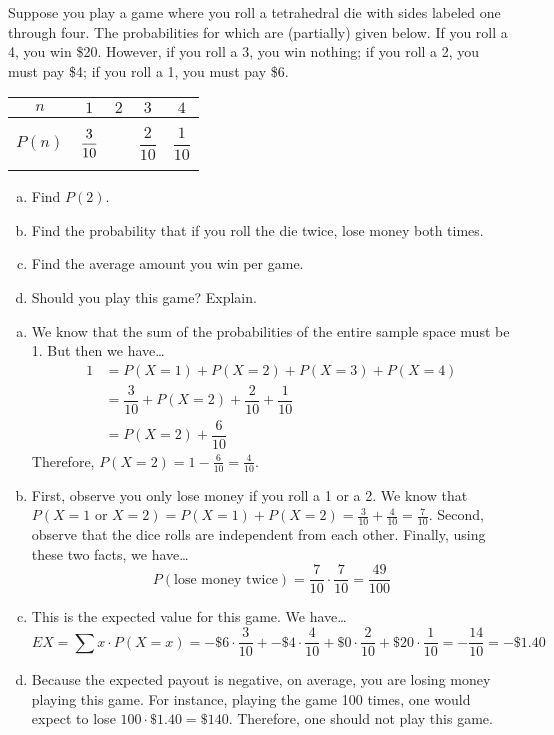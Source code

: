 \documentclass[11pt,letterpaper]{article}
\begin{document}
 Suppose you play a game where you roll a tetrahedral die with sides labeled one through four. The probabilities for which are (partially) given below. If you roll a 4, you win \$20. However, if you roll a 3, you win nothing; if you roll a 2, you must pay \$4; if you roll a 1, you must pay \$6. 
	\begin{table}[!ht]
	\centering 
	\begin{tabular}{|c||c|c|c|c|} \hline 
	$n$ & $1$ & $2$ & $3$ & $4$ \\ \hline 
	$P(n)$ & $\dfrac{3\rule{0pt}{2.9ex}}{10\rule[-1.3ex]{0pt}{0pt}}$ & \phantom{$\dfrac{00}{00}$} & $\dfrac{2}{10}$ & $\dfrac{1}{10}$ \\ \hline 
	\end{tabular}
	\end{table}

\begin{enumerate}[(a)]
\item Find $P(2)$. 
\item Find the probability that if you roll the die twice, lose money both times. 
\item Find the average amount you win per game. 
\item Should you play this game? Explain.
\end{enumerate} \pspace

\sol 
\begin{enumerate}[(a)]
\item We know that the sum of the probabilities of the entire sample space must be 1. But then we have\dots
	\[
	\begin{aligned}
	1&= P(X= 1) + P(X= 2) + P(X= 3) + P(X= 4) \\[0.3cm]
	&= \dfrac{3}{10} + P(X= 2) + \dfrac{2}{10} + \dfrac{1}{10} \\[0.3cm]
	&= P(X= 2) + \dfrac{6}{10}
	\end{aligned}
	\]
Therefore, $P(X= 2)= 1 - \frac{6}{10}= \frac{4}{10}$. \pspace

\item First, observe you only lose money if you roll a 1 or a 2. We know that $P(X= 1 \text{ or } X= 2)= P(X= 1) + P(X= 2)= \frac{3}{10} + \frac{4}{10}= \frac{7}{10}$. Second, observe that the dice rolls are independent from each other. Finally, using these two facts, we have\dots
	\[
	P(\text{lose money twice})= \dfrac{7}{10} \cdot \dfrac{7}{10}= \dfrac{49}{100}
	\] \pspace

\item This is the expected value for this game. We have\dots
	\[
	EX= \sum x \cdot P(X= x)= -\$6 \cdot \dfrac{3}{10} + -\$4 \cdot \dfrac{4}{10} + \$0 \cdot \dfrac{2}{10} + \$20 \cdot \dfrac{1}{10}= -\dfrac{14}{10}= -\$1.40
	\] \pspace

\item Because the expected payout is negative, on average, you are losing money playing this game. For instance, playing the game 100 times, one would expect to lose $100 \cdot \$1.40= \$140$. Therefore, one should not play this game. 
\end{enumerate}
\end{document}
